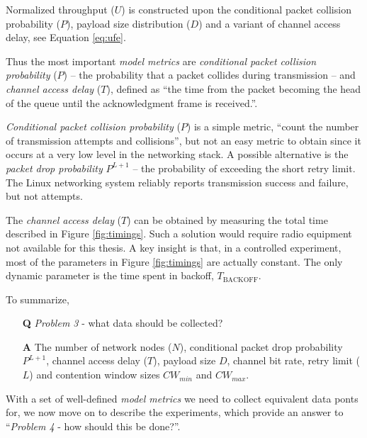 Normalized throughput ($U$) is constructed upon the conditional packet
collision probability ($P$), payload size distribution ($D$) and a variant of
channel access delay, see Equation \ref{eq:ufe}.

Thus the most important \emph{model metrics} are \emph{conditional packet
collision probability} ($P$) -- the probability that a packet collides during
transmission -- and \emph{channel access delay} ($T$), defined as ``the time
from the packet becoming the head of the queue until the acknowledgment frame
is received.''.

\emph{Conditional packet collision probability} ($P$) is a simple metric,
``count the number of transmission attempts and collisions'', but not an easy
metric to obtain since it occurs at a very low level in the networking stack.
A possible alternative is the \emph{packet drop probability} $P^{L+1}$ -- the
probability of exceeding the short retry limit. The Linux networking system
reliably reports transmission success and failure, but not attempts.

The \emph{channel access delay} ($T$) can be obtained by measuring the total time
described in Figure \ref{fig:timings}. Such a solution would require radio
equipment not available for this thesis. A key insight is that, in a
controlled experiment, most of the parameters in Figure \ref{fig:timings}
are actually constant. The only dynamic parameter is the time spent in
backoff, $T_{\text{BACKOFF}}$.

To summarize,

\begin{itemize}

    \item[\textbf{Q}] \emph{Problem 3} - what data should be collected?

    \item[\textbf{A}] The number of network nodes ($N$), conditional
    packet drop probability $P^{L+1}$, channel access delay ($T$), payload
    size $D$, channel bit rate, retry limit ($L$) and
    contention window sizes $CW_{min}$ and $CW_{max}$.

\end{itemize}

With a set of well-defined \emph{model metrics} we need to collect equivalent
data ponts for, we now move on to describe the experiments, which provide an
answer to ``\emph{Problem 4} - how should this be done?''.


